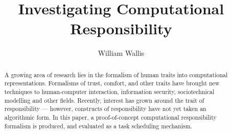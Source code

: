 



\title{Investigating Computational Responsibility}
\author{William Wallis}

\maketitle

\begin{abstract}

A growing area of research lies in the formalism of human traits into computational representations. Formalisms of trust, comfort, and other traits have brought new techniques to human-computer interaction, information security, sociotechnical modelling and other fields. Recently, interest has grown around the trait of responsibility --- however, constructs of responsibility have not yet taken an algorithmic form. In this paper, a proof-of-concept computational responsibility formalism is produced, and evaluated as a task scheduling mechanism.


\end{abstract}

